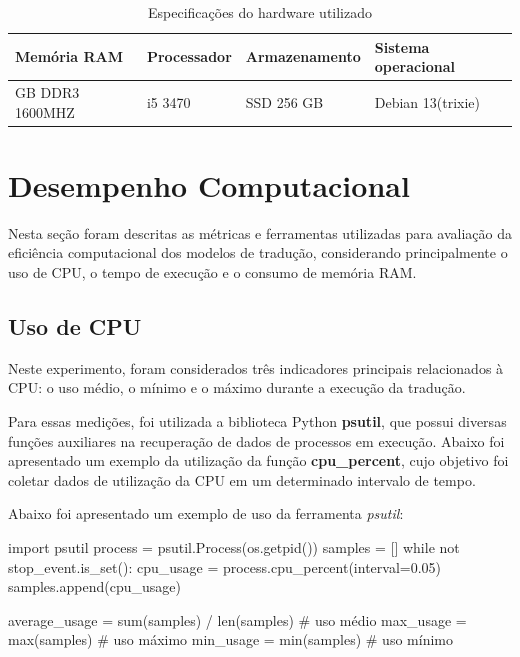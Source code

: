 \begin{table}[H]
\centering
\begin{tabular}{ |p{3cm}|p{3cm}|p{3cm}|p{3cm}| }
\hline
\multicolumn{1}{|p{3cm}|}{\centering\textbf{Memória RAM}} & \multicolumn{1}{p{3cm}|}{\centering\textbf{Processador}} & \multicolumn{1}{p{3cm}|}{\centering\textbf{Armazenamento}} & \multicolumn{1}{p{3cm}|}{\centering\textbf{Sistema operacional}} \\
\hline
\multicolumn{1}{|p{3cm}|}{\centering 16 GB DDR3 1600MHZ} & \multicolumn{1}{p{3cm}|}{\centering i5 3470} & \multicolumn{1}{p{3cm}|}{\centering SSD 256 GB} & \multicolumn{1}{p{3cm}|}{\centering Debian 13(trixie)} \\
\hline
\end{tabular}
\caption{Especificações do hardware utilizado}
\label{tab:ambiente_computacional}
\end{table}

\section{Desempenho Computacional}

Nesta seção foram descritas as métricas e ferramentas utilizadas para avaliação da eficiência computacional dos modelos de tradução, considerando principalmente o uso de CPU, o tempo de execução e o consumo de memória RAM.

\subsection{Uso de CPU}

Neste experimento, foram considerados três indicadores principais relacionados à CPU: o uso médio, o mínimo e o máximo durante a execução da tradução.

Para essas medições, foi utilizada a biblioteca Python \textbf{psutil}, que possui diversas funções auxiliares na recuperação de dados de processos em execução. Abaixo foi apresentado um exemplo da utilização da função \textbf{cpu\_percent}, cujo objetivo foi coletar dados de utilização da CPU em um determinado intervalo de tempo.

Abaixo foi apresentado um exemplo de uso da ferramenta \textit{psutil}:

\begin{listing}
\begin{python}
import psutil
process = psutil.Process(os.getpid())
samples = []
while not stop_event.is_set():
    cpu_usage = process.cpu_percent(interval=0.05)
    samples.append(cpu_usage)

average_usage = sum(samples) / len(samples) # uso médio
max_usage = max(samples) # uso máximo
min_usage = min(samples) # uso mínimo

\end{python}
\caption{Exemplo de uso da ferramenta \textit{psutil} para verificação do uso de CPU}
\label{code:hyperfine}
\end{listing}


